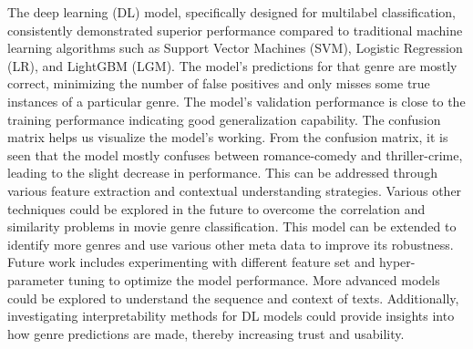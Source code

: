 \documentclass[hbrs-poster.tex]{subfiles}
\begin{document}
    {
        The deep learning (DL) model, specifically designed for multilabel classification, consistently demonstrated superior performance compared to traditional machine learning algorithms such as Support Vector Machines (SVM), Logistic Regression (LR), and LightGBM (LGM). The model's predictions for that genre are mostly correct, minimizing the number of false positives and only misses some true instances of a particular genre. The model's validation performance is close to the training performance indicating good generalization capability.
        \newline
        \newline
        The confusion matrix helps us visualize the model's working. From the confusion matrix, it is seen that the model mostly confuses between romance-comedy and thriller-crime, leading to the slight decrease in performance. This can be addressed through various feature extraction and contextual understanding strategies. Various other techniques could be explored in the future to overcome the correlation and similarity problems in movie genre classification. 
        \newline
        \newline
        This model can be extended to identify more genres and use various other meta data to improve its robustness. Future work includes experimenting with different feature set and hyper-parameter tuning to optimize the model performance. More advanced models could be explored to understand the sequence and context of texts. Additionally, investigating interpretability methods for DL models could provide insights into how genre predictions are made, thereby increasing trust and usability.

    }
\end{document}
